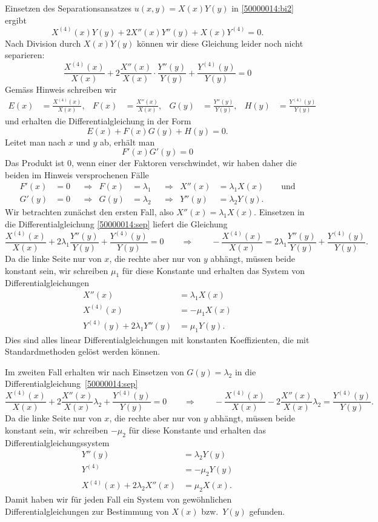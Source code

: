 \begin{loesung}
Einsetzen des Separationsansatzes $u(x,y)=X(x)Y(y)$ in 
\eqref{50000014:bi2} ergibt
\[
X^{(4)}(x)Y(y) + 2X''(x) Y''(y) + X(x)Y^{(4)}=0.
\]
Nach Division durch $X(x)Y(y)$ können wir diese Gleichung leider noch
nicht separieren:
\begin{equation}
\frac{X^{(4)}(x)}{X(x)}
+
2\frac{X''(x)}{X(x)}\cdot \frac{Y''(y)}{Y(y)}
+
\frac{Y^{(4)}(y)}{Y(y)}
=
0
\label{50000014:sep}
\end{equation}
Gemäss Hinweis schreiben wir
\begin{align*}
E(x)&=\frac{X^{(4)}(x)}{X(x)},
&
F(x)&=\frac{X''(x)}{X(x)},
&
G(y)&=\frac{Y''(y)}{Y(y)},
&
H(y)&=\frac{Y^{(4)}(y)}{Y(y)}
\end{align*}
und erhalten die Differentialgleichung in der Form
\[
E(x) + F(x) G(y) + H(y) = 0.
\]
Leitet man nach $x$ und $y$ ab, erhält man
\[
F'(x) G'(y)=0
\]
Das Produkt ist $0$, wenn einer der Faktoren verschwindet, wir haben
daher die beiden im Hinweis versprochenen Fälle 
\[
\begin{aligned}
F'(x)&=0&&\Rightarrow& F(x)&=\lambda_1&&\Rightarrow& X''(x)&=\lambda_1 X(x)
\qquad\text{und}
\\
G'(y)&=0&&\Rightarrow& G(y)&=\lambda_2&&\Rightarrow& Y''(y)&=\lambda_2 Y(y).
\end{aligned}
\]
Wir betrachten zunächst den ersten Fall, also $X''(x)=\lambda_1 X(x)$.
Einsetzen in die Differentialgleichung \eqref{50000014:sep} liefert
die Gleichung
\[
\frac{X^{(4)}(x)}{X(x)}
+
2\lambda_1\frac{Y''(y)}{Y(y)}
+
\frac{Y^{(4)}(y)}{Y(y)}
=0
\qquad\Rightarrow\qquad
-\frac{X^{(4)}(x)}{X(x)}
=
2\lambda_1\frac{Y''(y)}{Y(y)}
+
\frac{Y^{(4)}(y)}{Y(y)}.
\]
Da die linke Seite nur von $x$, die rechte aber nur von $y$ abhängt, müssen
beide konstant sein, wir schreiben $\mu_1$ für diese Konstante und
erhalten das System von Differentialgleichungen
\begin{align*}
X''(x)&=\lambda_1 X(x)
\\
X^{(4)}(x)&=-\mu_1 X(x)
\\
Y^{(4)}(y)
+
2\lambda_1 Y''(y)
&=
\mu_1 Y(y).
\end{align*}
Dies sind alles linear Differentialgleichungen mit konstanten Koeffizienten,
die mit Standardmethoden gelöst werden können.

Im zweiten Fall erhalten wir nach Einsetzen von $G(y)=\lambda_2$ in
die Differentialgleichung~\eqref{50000014:sep}
\[
\frac{X^{(4)}(x)}{X(x)}
+
2\frac{X''(x)}{X(x)}\lambda_2
+
\frac{Y^{(4)}(y)}{Y(y)}
=0
\qquad\Rightarrow\qquad
-\frac{X^{(4)}(x)}{X(x)}
-
2\frac{X''(x)}{X(x)}\lambda_2
=
\frac{Y^{(4)}(y)}{Y(y)}.
\]
Da die linke Seite nur von $x$, die rechte aber nur von $y$ abhängt, müssen
beide konstant sein, wir schreiben $-\mu_2$ für diese Konstante und erhalten
das Differentialgleichungssystem
\begin{align*}
Y''(y)&=\lambda_2 Y(y)
\\
Y^{(4)}&=-\mu_2 Y(y)
\\
X^{(4)}(x) + 2\lambda_2 X''(x) &= \mu_2 X(x).
\end{align*}
Damit haben wir für jeden Fall ein System von gewöhnlichen
Differentialgleichungen zur Bestimmung von $X(x)$ bzw.~$Y(y)$
gefunden.
\end{loesung}





